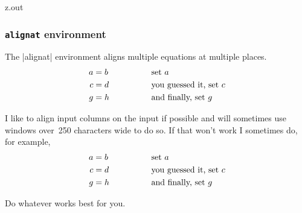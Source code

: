 \begin{VerbatimOut}{z.out}

\subsubsection{\texttt{alignat} environment}

The
|alignat|
environment aligns multiple equations at multiple places.
\begin{alignat}{2}
  a &= b& \qquad\qquad& \text{set \(a\)}\\
  c &= d& &             \text{you guessed it, set \(c\)}\notag\\
  g &= h& &             \text{and finally, set \(g\)}
\end{alignat}

I like to align input columns on the input if possible
and will sometimes use windows over~250 characters wide to do so.
If that won't work I sometimes do,
for example,
\begin{alignat}{2}
  a
    &= b
    & \qquad\qquad
    & \text{set \(a\)}\\
  c
    &= d
    &
    &\text{you guessed it, set \(c\)}\notag\\
  g
    &= h
    &
    &\text{and finally, set \(g\)}
\end{alignat}

Do whatever works best for you.

\end{VerbatimOut}

\MyIO


